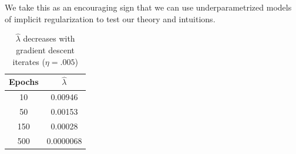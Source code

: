 \documentclass[10pt]{article}
\begin{document}
We take this as an encouraging sign that we can use underparametrized models of implicit regularization to test our theory and intuitions. 

\begin{table}[htbp]
\centering
\caption{$\hat{\lambda}$ decreases with gradient descent iterates ($\eta=.005$)}
\label{tab:lambda_results}
\begin{tabular}{cc}
\toprule
Epochs & $\hat{\lambda}$ \\
\midrule
10 & 0.00946 \\
50 & 0.00153 \\
150 & 0.00028 \\
500 & 0.0000068 \\
\bottomrule
\end{tabular}
\end{table}




\end{document}
